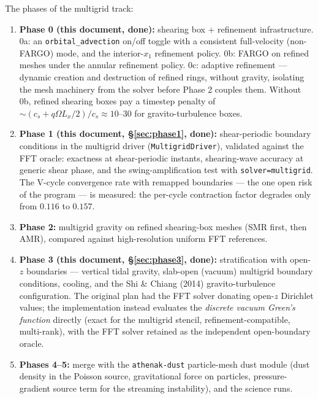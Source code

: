 \documentclass[11pt]{article}
\newcommand{\code}[1]{\texttt{#1}}
\begin{document}
The phases of the multigrid track:
\begin{enumerate}
  \item \textbf{Phase 0 (this document, done):} shearing box + refinement
        infrastructure. 0a: an \code{orbital\_advection} on/off toggle with a
        consistent full-velocity (non-FARGO) mode, and the interior-$x_1$ refinement
        policy. 0b: FARGO on refined meshes under the annular refinement policy.
        0c: adaptive refinement --- dynamic creation and destruction of refined
        rings, without gravity, isolating the mesh machinery from the solver
        before Phase 2 couples them.
        Without 0b, refined shearing boxes pay a timestep penalty of
        $\sim(c_s + q\Omega L_x/2)/c_s \approx 10$--$30$ for gravito-turbulence boxes.
  \item \textbf{Phase 1 (this document, \S\ref{sec:phase1}, done):} shear-periodic
        boundary conditions in the multigrid driver (\code{MultigridDriver}),
        validated against the FFT oracle: exactness at shear-periodic instants,
        shearing-wave accuracy at generic shear phase, and the swing-amplification
        test with \code{solver=multigrid}. The V-cycle convergence rate with
        remapped boundaries --- the one open risk of the program --- is measured:
        the per-cycle contraction factor degrades only from $0.116$ to $0.157$.
  \item \textbf{Phase 2:} multigrid gravity on refined shearing-box meshes (SMR
        first, then AMR), compared against high-resolution uniform FFT references.
  \item \textbf{Phase 3 (this document, \S\ref{sec:phase3}, done):} stratification
        with open-$z$ boundaries --- vertical tidal gravity, slab-open (vacuum)
        multigrid boundary conditions, cooling, and the Shi \& Chiang (2014)
        gravito-turbulence configuration. The original plan had the FFT solver
        donating open-$z$ Dirichlet values; the implementation instead evaluates
        the \emph{discrete vacuum Green's function} directly (exact for the
        multigrid stencil, refinement-compatible, multi-rank), with the FFT
        solver retained as the independent open-boundary oracle.
  \item \textbf{Phases 4--5:} merge with the \code{athenak-dust} particle-mesh dust
        module (dust density in the Poisson source, gravitational force on particles,
        pressure-gradient source term for the streaming instability), and the
        science runs.
\end{enumerate}
\end{document}
